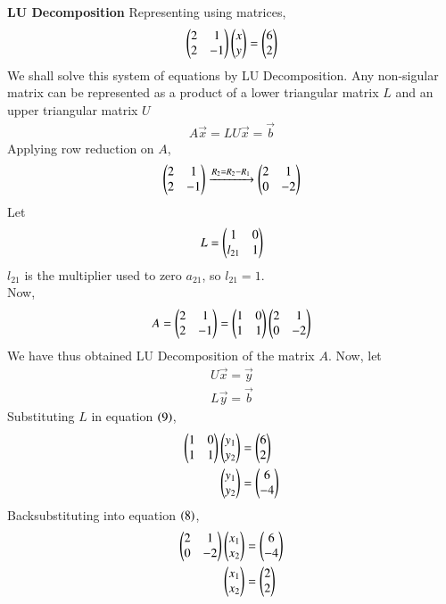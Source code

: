 \documentclass[journal]{IEEEtran}
\begin{document}
\textbf{LU Decomposition}\newline
Representing using matrices,
\begin{align}
    \begin{pmatrix}
        2 & 1\\
        2 & -1
    \end{pmatrix} \begin{pmatrix}x \\ y\end{pmatrix}= \begin{pmatrix} 6 \\ 2\end{pmatrix}
\end{align}
We shall solve this system of equations by LU Decomposition. Any non-sigular matrix can be represented as a product of a lower triangular matrix $L$ and an upper triangular matrix $U$
\begin{align}
    A\vec{x} = LU\vec{x} = \vec{b}
\end{align}
Applying row reduction on $A$,
\begin{align}
  \begin{pmatrix}2 & 1\\ 2 & -1\end{pmatrix} \xrightarrow{R_2 = R_2 - R_1} \begin{pmatrix}2 & 1 \\ 0 & -2\end{pmatrix}
\end{align}
Let 
\begin{align}
    L = \begin{pmatrix}1 & 0\\ l_{21} & 1\end{pmatrix}
\end{align}
$l_{21}$ is the multiplier used to zero $a_{21}$, so $l_{21} = 1$.\\
\newline
Now,
\begin{align}
    A = \begin{pmatrix}2 & 1 \\ 2 & -1\end{pmatrix} = \begin{pmatrix}1 & 0 \\ 1 & 1\end{pmatrix}\begin{pmatrix}2 & 1 \\ 0 & -2\end{pmatrix}
\end{align}
We have thus obtained LU Decomposition of the matrix $A$.
Now, let
\begin{align}
  U\vec{x} = \vec{y}\\
  L\vec{y} = \vec{b}
\end{align}
Substituting $L$ in equation $\left(9\right)$,
\begin{align}
  \begin{pmatrix}1 & 0 \\ 1 & 1\end{pmatrix}\begin{pmatrix}y_1 \\ y_2\end{pmatrix} &= \begin{pmatrix}6 \\ 2\end{pmatrix}\\
  \begin{pmatrix}y_1 \\ y_2\end{pmatrix} &= \begin{pmatrix}6 \\ -4\end{pmatrix}
\end{align}
Backsubstituting into equation $\left(8\right)$,
\begin{align}
  \begin{pmatrix}2 & 1 \\ 0 & -2\end{pmatrix}\begin{pmatrix}x_1 \\ x_2\end{pmatrix} &= \begin{pmatrix}6 \\ -4\end{pmatrix}\\
  \begin{pmatrix}x_1 \\ x_2\end{pmatrix} &= \begin{pmatrix} 2 \\ 2\end{pmatrix}
\end{align}
\end{document}
